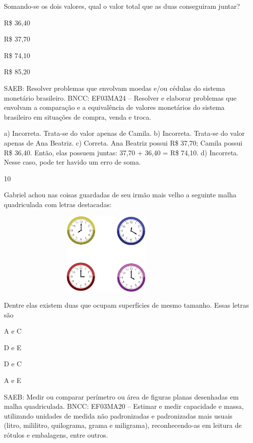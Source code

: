 \begin{multicols}{2}
{\begin{escolha}
{%

Somando-se os dois valores, qual o valor total que as duas conseguiram juntar?

\begin{escolha}
\item
  R\$ 36,40
\item
  R\$ 37,70
\item
  R\$ 74,10
\item
  R\$ 85,20
\end{escolha}

SAEB: Resolver problemas que envolvam moedas e/ou cédulas do
sistema monetário brasileiro.
BNCC: EF03MA24 -- Resolver e elaborar problemas que envolvam a comparação e a equivalência de
valores monetários do sistema brasileiro em situações de compra, venda e troca.

a) Incorreta. Trata-se do valor apenas de Camila.
b) Incorreta. Trata-se do valor apenas de Ana Beatriz.
c) Correta. Ana Beatriz possui R\$ 37,70; Camila possui R\$ 36,40. Então, elas possuem juntas: 37,70 + 36,40 = R\$ 74,10.
d) Incorreta. Nesse caso, pode ter havido um erro de soma.

\num{10}

Gabriel achou nas coisas guardadas de seu irmão mais velho a seguinte malha quadriculada com letras destacadas:


\includegraphics[width=4.36538in,height=1.60417in]{media/image111.png}

Dentre elas existem duas que ocupam superfícies de mesmo tamanho. Essas letras são

\begin{escolha}
\item
  A e C
\item
  D e E
\item
  D e C
\item
  A e E
\end{escolha}

SAEB: Medir ou comparar perímetro ou área de figuras planas
desenhadas em malha quadriculada.
BNCC: EF03MA20 -- Estimar e medir capacidade e massa, utilizando unidades de medida não
padronizadas e padronizadas mais usuais (litro, mililitro, quilograma, grama e miligrama),
reconhecendo-as em leitura de rótulos e embalagens, entre outros.

}
\end{escolha}}
\end{multicols}

